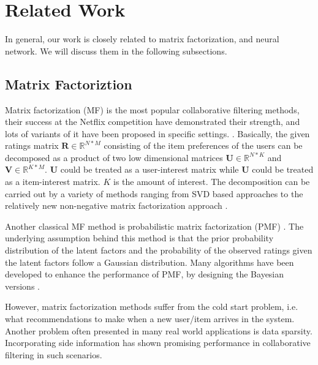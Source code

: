 \documentclass{sig-alternate-05-2015}
\begin{document}
\section{Related Work}
In general, our work is closely related to matrix factorization,
and neural network. We will discuss them in the following subsections.

\subsection{Matrix Factoriztion}
Matrix factorization (MF) is the most popular collaborative filtering methods,
their success at the Netflix competition have demonstrated their strength,
and lots of variants of it have been proposed in specific settings.
\cite{koren2009matrix, bennett2007netflix}.
Basically, the given ratings matrix $\mathbf{R} \in \mathbb{R}^{N*M}$
consisting of the item preferences of the users can be decomposed as
a product of two low dimensional matrices $\mathbf{U} \in \mathbb{R}^{N*K}$
and $\mathbf{V} \in \mathbb{R}^{K*M}$.
$\mathbf{U}$ could be treated as a user-interest matrix while
$\mathbf{U}$ could be treated as a item-interest matrix.
$K$ is the amount of interest.
The decomposition can be carried out by a variety of methods
ranging from SVD based approaches \cite{mazumder2010spectral}
to the relatively new non-negative
matrix factorization approach \cite{lee2001algorithms}.

Another classical MF method is probabilistic matrix factorization
(PMF) \cite{salakhutdinov2011probabilistic}.
The underlying assumption behind this method is that
the prior probability distribution of the latent factors and
the probability of the observed ratings given the latent factors
follow a Gaussian distribution.
Many algorithms have been developed to enhance the performance of PMF,
by designing the Bayesian versions \cite{salakhutdinov2008bayesian, xu2013fast, shi2013scmf}.

However, matrix factorization methods suffer from the cold start problem,
i.e. what recommendations to make when a new user/item arrives in the system.
Another problem often presented in many real world applications is data sparsity.
Incorporating side information has shown promising performance
in collaborative filtering in such scenarios.
\end{document}
